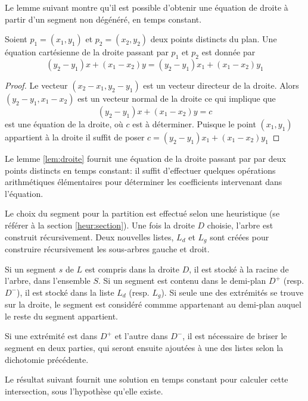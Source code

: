 Le lemme suivant montre qu'il est possible d'obtenir une équation de droite
à partir d'un segment non dégénéré, en temps constant.

\begin{lem}\label{lem:droite}
  Soient $p_1 = (x_1, y_1)$ et $p_2 = (x_2, y_2)$ deux points distincts du
  plan. Une équation cartésienne de la droite  passant par $p_1$ et $p_2$
  est donnée par
  \begin{equation}
    \left(y_2 - y_1\right) x + \left(x_1 - x_2\right) y =
    \left(y_2 - y_1\right) x_1 + \left(x_1 - x_2\right) y_1
  \end{equation}
\end{lem}
\begin{proof}
  Le vecteur $(x_2 - x_1, y_2 - y_1)$ est un vecteur directeur de la droite.
  Alors $(y_2 - y_1, x_1 - x_2)$ est un vecteur normal de la droite ce qui
  implique que
  $$\left(y_2 - y_1\right) x + \left(x_1 - x_2\right) y = c$$ est une équation
  de la droite, où $c$ est à déterminer.
  Puisque le point $(x_1, y_1)$ appartient à la droite il suffit de poser
  $c = \left(y_2 - y_1\right) x_1 + \left(x_1 - x_2\right) y_1$
\end{proof}

Le lemme \ref{lem:droite} fournit une équation de la droite passant par
par deux points distincts en temps constant: il suffit d'effectuer
quelques opérations arithmétiques élémentaires pour déterminer les
coefficients intervenant dans l'équation.

Le choix du segment
pour la partition est effectué selon une heuristique (se référer à la section
\ref{heur:section}).
Une fois la droite $D$ choisie, l'arbre est construit récursivement.
Deux nouvelles listes, $L_d$ et $L_g$ sont créées pour construire récursivement
les sous-arbres gauche et droit.

Si un segment $s$ de $L$ est compris dans la droite $D$, il est stocké à
la racine de l'arbre, dans l'ensemble $S$. Si un segment est contenu dans
le demi-plan $D^+$ (resp. $D^-$), il est stocké dans la liste $L_d$ (resp.
$L_g$). Si seule une des extrémités se trouve sur la droite, le segment
est considéré commme appartenant au
 demi-plan auquel le reste du segment appartient.

Si une extrémité est dans $D^+$ et l'autre dans $D^-$, il est nécessaire
de briser le segment en deux parties, qui seront ensuite ajoutées à une des
listes selon la dichotomie précédente.

Le résultat suivant fournit une solution en temps constant pour calculer
cette intersection, sous l'hypothèse qu'elle existe.

